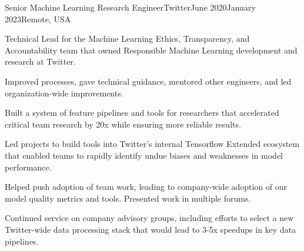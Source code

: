 \documentclass[print]{ag-cv} %
\begin{document}
\begin{job}
  {}{Senior Machine Learning Research Engineer}{Twitter}{June 2020}{January 2023}{Remote, USA}{
    Technical Lead for the Machine Learning Ethics, Transparency, and Accountability team that owned
    Responsible Machine Learning development and research at Twitter.
    

    \begin{myitemize}

      \item Improved processes, gave technical guidance, mentored other engineers, and led
      organization-wide improvements.

      \item Built a system of feature pipelines and tools for researchers that accelerated critical team
      research by 20x while ensuring more reliable results.

      \item Led projects to build tools into Twitter's internal Tensorflow Extended ecosystem that enabled teams to
      rapidly identify undue biases and weaknesses in model performance.

      \item Helped push adoption of team work, leading to company-wide adoption of our model quality metrics and tools. Presented work in multiple forums.
      \autocite{twitter_htl_racial_bias,twitter_recsys_distributional_inequality,facct_2022_talk,datascience_2022_talk,privacy_enchancing_tech_post}

      \item Continued service on company advisory groups, including efforts to select a new Twitter-wide data processing stack that would 
      lead to 3-5x speedups in key data pipelines.

    \end{myitemize}
  }
\end{job}
\end{document}
